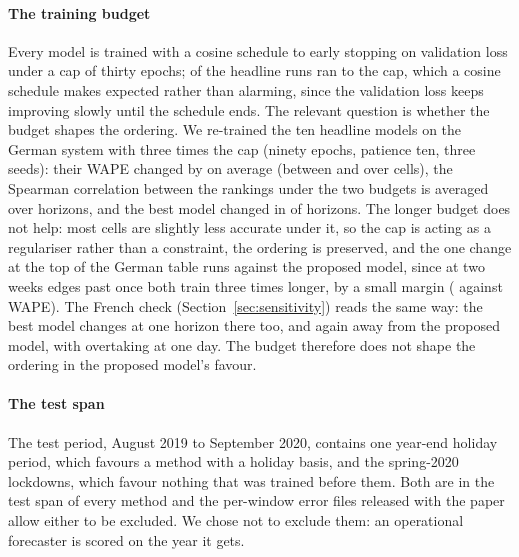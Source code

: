 \paragraph{The training budget} Every model is trained with a cosine schedule to early stopping
on validation loss under a cap of thirty epochs;  of the
 headline runs ran to the cap, which a cosine schedule makes expected
rather than alarming, since the validation loss keeps improving slowly until the schedule ends.
The relevant question is whether the budget shapes the ordering. We re-trained the ten
headline models on the German system with three times the cap (ninety epochs, patience ten,
three seeds): their WAPE changed by  on average (between
 and  over
 cells), the Spearman correlation between the rankings under the
two budgets is  averaged over horizons, and the best model
changed in  of  horizons.
The longer budget does not help: most cells are slightly less accurate under it, so the cap is
acting as a regulariser rather than a constraint, the ordering is preserved, and the one change
at the top of the German table runs against the proposed model, since at two weeks  edges past
 once both train three times longer, by a small margin
( against  WAPE). The French check (Section~\ref{sec:sensitivity}) reads the same way:
the best model changes at one horizon there too, and again away from the proposed model, with
 overtaking  at one day.
The budget therefore does not shape the ordering in the proposed model's favour.

\paragraph{The test span} The test period, August 2019 to September 2020, contains one
year-end holiday period, which favours a method with a holiday basis, and the spring-2020
lockdowns, which favour nothing that was trained before them. Both are in the test span of
every method and the per-window error files released with the paper allow either to be
excluded. We chose not to exclude them: an operational forecaster is scored on the year it
gets.

